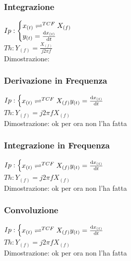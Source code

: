        \subsubsection{Integrazione}\label{Integrazione}
            $Ip:\begin{cases}
                x_{(t)}\rightleftharpoons^{TCF} X_{(f)}\\
                y_{(t)}= \derivative{x_{(t)}}{t}        
            \end{cases}$\\
            $Th: Y_{(f)} =\frac{X_{(f)}}{j2\pi f}$ \\
            Dimostrazione:\\

            
        \subsubsection{Derivazione in Frequenza}\label{Derivazione in Frequenza}
            $Ip:\begin{cases}
                x_{(t)}\rightleftharpoons^{TCF} X_{(f)}
                y_{(t)}= \derivative{x_{(t)}}{t}\\        
            \end{cases}$\\
            $Th: Y_{(f)} = j2\pi f X_{(f)} $ \\
            Dimostrazione: ok per ora non l'ha fatta
                
        \subsubsection{Integrazione in Frequenza}\label{Integrazione in Frequenza}
            $Ip:\begin{cases}
                x_{(t)}\rightleftharpoons^{TCF} X_{(f)}
                y_{(t)}= \derivative{x_{(t)}}{t}\\        
            \end{cases}$\\
            $Th: Y_{(f)} = j2\pi f X_{(f)} $ \\
            Dimostrazione: ok per ora non l'ha fatta
            
        \subsubsection{Convoluzione}\label{Convoluzione}
            $Ip:\begin{cases}
                x_{(t)}\rightleftharpoons^{TCF} X_{(f)}
                y_{(t)}= \derivative{x_{(t)}}{t}\\        
            \end{cases}$\\
            $Th: Y_{(f)} = j2\pi f X_{(f)} $ \\
            Dimostrazione: ok per ora non l'ha fatta
                
